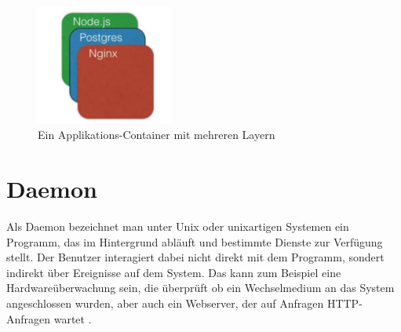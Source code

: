 \begin{figure}[!ht]
  \centering
  \includegraphics[width=0.4\textwidth]{images/application-container.jpg}
  \caption{Ein Applikations-Container mit mehreren Layern}
\end{figure}


\section{Daemon}
Als Daemon bezeichnet man unter Unix oder unixartigen Systemen ein Programm, das im Hintergrund abläuft und bestimmte Dienste zur Verfügung stellt. Der Benutzer interagiert dabei nicht direkt mit dem Programm, sondert indirekt über Ereignisse auf dem System. Das kann zum Beispiel eine Hardwareüberwachung sein, die überprüft ob ein Wechselmedium an das System angeschlossen wurden, aber auch ein Webserver, der auf Anfragen HTTP-Anfragen wartet \cite{wiki:daemon}.
